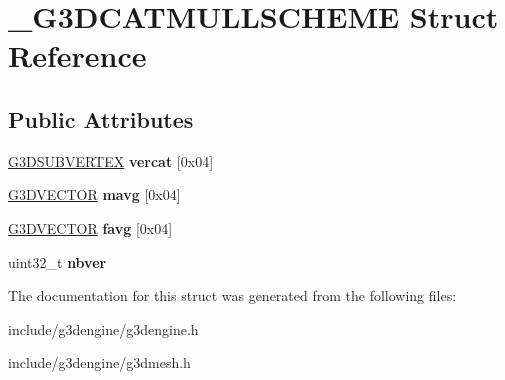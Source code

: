 \hypertarget{struct__G3DCATMULLSCHEME}{}\section{\+\_\+\+G3\+D\+C\+A\+T\+M\+U\+L\+L\+S\+C\+H\+E\+ME Struct Reference}
\label{struct__G3DCATMULLSCHEME}
\subsection*{Public Attributes}
\begin{DoxyCompactItemize}
\item 
\mbox{\label{struct__G3DCATMULLSCHEME_ae597ab9167f679155e75a81e0d6b040b}} 
\hyperlink{struct__G3DINNERVERTEX}{G3\+D\+S\+U\+B\+V\+E\+R\+T\+EX} {\bfseries vercat} \mbox{[}0x04\mbox{]}
\item 
\mbox{\label{struct__G3DCATMULLSCHEME_a0e7c661b1e67831378560ceee35c8459}} 
\hyperlink{struct__G3DVECTOR}{G3\+D\+V\+E\+C\+T\+OR} {\bfseries mavg} \mbox{[}0x04\mbox{]}
\item 
\mbox{\label{struct__G3DCATMULLSCHEME_adfc2f1043be788f7a0795565e33acea0}} 
\hyperlink{struct__G3DVECTOR}{G3\+D\+V\+E\+C\+T\+OR} {\bfseries favg} \mbox{[}0x04\mbox{]}
\item 
\mbox{\label{struct__G3DCATMULLSCHEME_a607b38b602882d28cb93774db6bc29e8}} 
uint32\+\_\+t {\bfseries nbver}
\end{DoxyCompactItemize}


The documentation for this struct was generated from the following files\+:\begin{DoxyCompactItemize}
\item 
include/g3dengine/g3dengine.\+h\item 
include/g3dengine/g3dmesh.\+h\end{DoxyCompactItemize}
